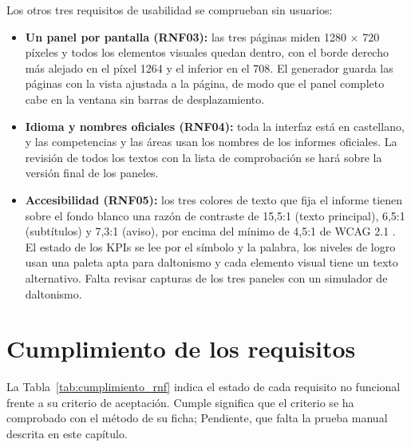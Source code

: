 \documentclass[12pt, a4paper, oneside]{report}
\begin{document}
Los otros tres requisitos de usabilidad se comprueban sin usuarios:
\begin{itemize}
    \item \textbf{Un panel por pantalla (RNF03):} las tres páginas miden 1280 $\times$ 720 píxeles y todos los elementos visuales quedan dentro, con el borde derecho más alejado en el píxel 1264 y el inferior en el 708. El generador guarda las páginas con la vista ajustada a la página, de modo que el panel completo cabe en la ventana sin barras de desplazamiento.
    \item \textbf{Idioma y nombres oficiales (RNF04):} toda la interfaz está en castellano, y las competencias y las áreas usan los nombres de los informes oficiales. La revisión de todos los textos con la lista de comprobación se hará sobre la versión final de los paneles.
    \item \textbf{Accesibilidad (RNF05):} los tres colores de texto que fija el informe tienen sobre el fondo blanco una razón de contraste de 15,5:1 (texto principal), 6,5:1 (subtítulos) y 7,3:1 (aviso), por encima del mínimo de 4,5:1 de WCAG 2.1 \cite{w3c_wcag21}. El estado de los KPIs se lee por el símbolo y la palabra, los niveles de logro usan una paleta apta para daltonismo y cada elemento visual tiene un texto alternativo. Falta revisar capturas de los tres paneles con un simulador de daltonismo.
\end{itemize}

\section{Cumplimiento de los requisitos}
\label{sec:val_requisitos}
La Tabla~\ref{tab:cumplimiento_rnf} indica el estado de cada requisito no funcional frente a su criterio de aceptación. \guillemotleft{}Cumple\guillemotright{} significa que el criterio se ha comprobado con el método de su ficha; \guillemotleft{}Pendiente\guillemotright{}, que falta la prueba manual descrita en este capítulo.
\end{document}
